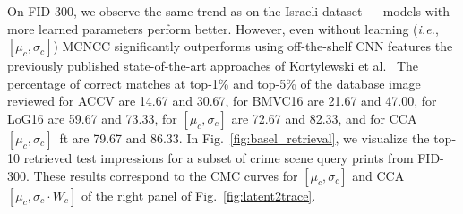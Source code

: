 \documentclass[twocolumn]{svjour3}           %
\newcommand{\ie}{\emph{i.e.}}
\begin{document}
On FID-300, we observe the same trend as on the Israeli dataset --- models with
more learned parameters perform better.  However, even without learning (\ie,
$[\mu_c,\sigma_c]$) MCNCC significantly outperforms using off-the-shelf
CNN features the previously published state-of-the-art approaches of
Kortylewski et
al.~\cite{kortylewski2014unsupervised,kortylewski2016probabilistic,kortylewski2017model}
The percentage of correct matches at top-1\% and top-5\% of the database image
reviewed for ACCV are 14.67 and 30.67, for BMVC16 are 21.67 and 47.00, for LoG16
are 59.67 and 73.33, for $[\mu_c,\sigma_c]$ are 72.67 and 82.33, and for
CCA~$[\mu_c,\sigma_c]$~ft are 79.67 and 86.33.
In Fig.~\ref{fig:basel_retrieval}, we visualize the top-10 retrieved test
impressions for a subset of crime scene query prints from FID-300.  These
results correspond to the CMC curves for $[\mu_c,\sigma_c]$ and
CCA~$[\mu_c,\sigma_c\cdot W_c]$ of the right panel of
Fig.~\ref{fig:latent2trace}.
\end{document}

